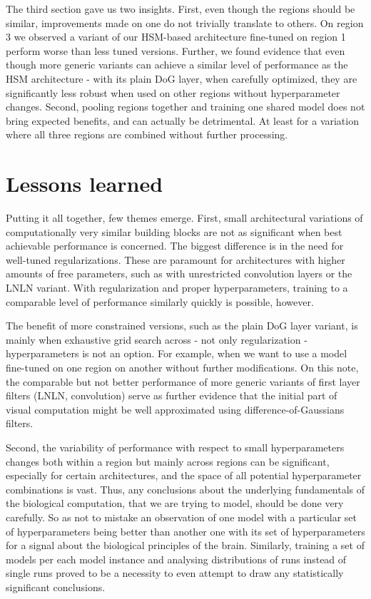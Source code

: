 The third section gave us two insights. First, even though the regions should be similar, improvements made on one do not trivially translate to others. On region 3 we observed a variant of our HSM-based architecture fine-tuned on region 1 perform worse than less tuned versions. Further, we found evidence that even though more generic variants can achieve a similar level of performance as the HSM architecture - with its plain DoG layer, when carefully optimized, they are significantly less robust when used on other regions without hyperparameter changes. Second, pooling regions together and training one shared model does not bring expected benefits, and can actually be detrimental. At least for a variation where all three regions are combined without further processing.

\section*{Lessons learned}

Putting it all together, few themes emerge. First, small architectural variations of computationally very similar building blocks are not as significant when best achievable performance is concerned. The biggest difference is in the need for well-tuned regularizations. These are paramount for architectures with higher amounts of free parameters, such as with unrestricted convolution layers or the LNLN variant. With regularization and proper hyperparameters, training to a comparable level of performance similarly quickly is possible, however. 

The benefit of more constrained versions, such as the plain DoG layer variant, is mainly when exhaustive grid search across - not only regularization - hyperparameters is not an option. For example, when we want to use a model fine-tuned on one region on another without further modifications. On this note, the comparable but not better performance of more generic variants of first layer filters (LNLN, convolution) serve as further evidence that the initial part of visual computation might be well approximated using difference-of-Gaussians filters.

Second, the variability of performance with respect to small hyperparameters changes both within a region but mainly across regions can be significant, especially for certain architectures, and the space of all potential hyperparameter combinations is vast. Thus, any conclusions about the underlying fundamentals of the biological computation, that we are trying to model, should be done very carefully. So as not to mistake an observation of one model with a particular set of hyperparameters being better than another one with its set of hyperparameters for a signal about the biological principles of the brain. Similarly, training a set of models per each model instance and analysing distributions of runs instead of single runs proved to be a necessity to even attempt to draw any statistically significant conclusions.

